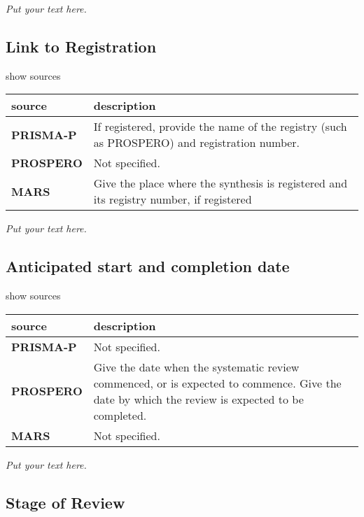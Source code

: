 \documentclass[]{article}
\begin{document}
\emph{Put your text here.}

\hypertarget{link-to-registration}{%
\subsection{Link to Registration}\label{link-to-registration}}

show sources

\hypertarget{ltr}{}
\begin{table}[H]
\centering
\begin{tabular}{>{\bfseries}l|l}
\hline
\rowcolor[HTML]{ececec}  source & description\\
\hline
PRISMA-P & If registered, provide the name of the registry (such as PROSPERO) and registration number.\\
\hline
PROSPERO & Not specified.\\
\hline
MARS & Give the place where the synthesis is registered and its registry number, if registered\\
\hline
\end{tabular}
\end{table}

\emph{Put your text here.}

\hypertarget{anticipated-start-and-completion-date}{%
\subsection{Anticipated start and completion
date}\label{anticipated-start-and-completion-date}}

show sources

\hypertarget{aasd}{}
\begin{table}[H]
\centering
\begin{tabular}{>{\bfseries}l|l}
\hline
\rowcolor[HTML]{ececec}  source & description\\
\hline
PRISMA-P & Not specified.\\
\hline
PROSPERO & Give the date when the systematic review commenced, or is expected to commence. Give the date by which the review is expected to be completed.\\
\hline
MARS & Not specified.\\
\hline
\end{tabular}
\end{table}

\emph{Put your text here.}

\hypertarget{stage-of-review}{%
\subsection{Stage of Review}\label{stage-of-review}}
\end{document}
